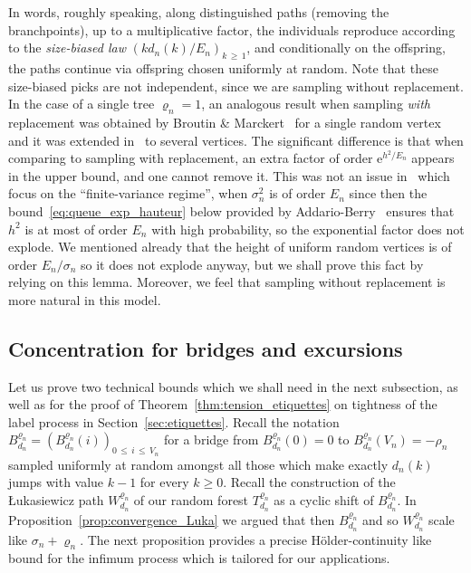 \documentclass[10pt]{amsart}
\theoremstyle{definition}\newtheorem{defi}[theo]{Definition}\newtheorem{rema}[theo]{Remark}\newtheorem{exam}[theo]{Example}\newtheorem{exem}[theo]{Example}\newtheorem{nota}[theo]{Notation}
\newcommand{\1}{\ensembles{1}}
\renewcommand{\le}{\leqslant}
\renewcommand{\ge}{\geqslant}
\newcommand{\e}{\mathrm{e}}
\newcommand{\fn}{T_{d_n}^{\varrho_n}}
\newcommand{\Wfn}{W_{d_n}^{\varrho_n}}
\newcommand{\Bfn}{B_{d_n}^{\varrho_n}}
\newcommand{\edges}{E}
\newcommand{\vertices}{V}
\providecommand{\?}{}
\begin{document}
In words, roughly speaking, along distinguished paths (removing the branchpoints), up to a multiplicative factor, the individuals reproduce according to the \emph{size-biased law} $(kd_n(k)/\edges_n)_{k\,\ge\,1}$, and conditionally on the offspring, the paths continue via offspring chosen uniformly at random. Note that these size-biased picks are not independent, since we are sampling without replacement. In the case of a single tree $\varrho_n = 1$, an analogous result when sampling \emph{with} replacement was obtained by Broutin \& Marckert~\cite{BM14} for a single random vertex and it was extended in~\cite{Mar18b} to several vertices. The significant difference is that when comparing to sampling with replacement, an extra factor of order $\e^{h^2/\edges_n}$ appears in the upper bound, and one cannot remove it. This was not an issue in~\cite{BM14, Mar18b} which focus on the ``finite-variance regime'', when $\sigma_n^2$ is of order $\edges_n$ since then the bound~\eqref{eq:queue_exp_hauteur} below provided by Addario-Berry~\cite{AB12} ensures that $h^2$ is at most of order $\edges_n$ with high probability, so the exponential factor does not explode. We mentioned already that the height of uniform random vertices is of order $\edges_n / \sigma_n$ so it does not explode anyway, but we shall prove this fact by relying on this lemma. Moreover, we feel that sampling without replacement is more natural in this model.



\subsection{Concentration for bridges and excursions}\label{sec:Luka}

Let us prove two technical bounds which we shall need in the next subsection, as well as for the proof of Theorem~\ref{thm:tension_etiquettes} on tightness of the label process in Section~\ref{sec:etiquettes}. Recall the notation $\Bfn = (\Bfn(i))_{0\,\le\,i\,\le\, \vertices_n}$ for a bridge from $\Bfn(0) = 0$ to $\Bfn(\vertices_n) = -\rho_n$ sampled uniformly at random amongst all those which make exactly $d_n(k)$ jumps with value $k-1$ for every $k \ge 0$. Recall the construction of the {\L}ukasiewicz path $\Wfn$ of our random forest $\fn$ as a cyclic shift of $\Bfn$. In Proposition~\ref{prop:convergence_Luka} we argued that then $\Bfn$ and so $\Wfn$ scale like $\sigma_n+\varrho_n$. The next proposition provides a precise Hölder-continuity like bound for the infimum process which is tailored for our applications.
\end{document}
